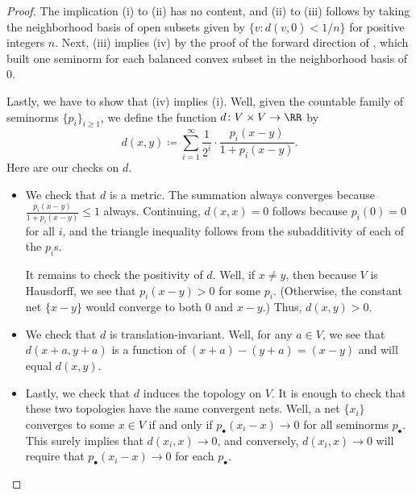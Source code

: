 \documentclass[notes.tex]{subfiles}
\begin{document}
\begin{proof}
	The implication (i) to (ii) has no content, and (ii) to (iii) follows by taking the neighborhood basis of open subsets given by $\{v:d(v,0)<1/n\}$ for positive integers $n$. Next, (iii) implies (iv) by the proof of the forward direction of , which built one seminorm for each balanced convex subset in the neighborhood basis of $0$.

	Lastly, we have to show that (iv) implies (i). Well, given the countable family of seminorms $\{p_i\}_{i\ge1}$, we define the function $d\colon V\times V\to\RR$ by
	\[d(x,y)\coloneqq\sum_{i=1}^\infty\frac1{2^i}\cdot\frac{p_i(x-y)}{1+p_i(x-y)}.\]
	Here are our checks on $d$.
	\begin{itemize}
		\item We check that $d$ is a metric. The summation always converges because $\frac{p_i(x-y)}{1+p_i(x-y)}\le1$ always. Continuing, $d(x,x)=0$ follows because $p_i(0)=0$ for all $i$, and the triangle inequality follows from the subadditivity of each of the $p_i$s.

		It remains to check the positivity of $d$. Well, if $x\ne y$, then because $V$ is Hausdorff, we see that $p_i(x-y)>0$ for some $p_i$. (Otherwise, the constant net $\{x-y\}$ would converge to both $0$ and $x-y$.) Thus, $d(x,y)>0$.

		\item We check that $d$ is translation-invariant. Well, for any $a\in V$, we see that $d(x+a,y+a)$ is a function of $(x+a)-(y+a)=(x-y)$ and will equal $d(x,y)$.

		\item Lastly, we check that $d$ induces the topology on $V$. It is enough to check that these two topologies have the same convergent nets. Well, a net $\{x_i\}$ converges to some $x\in V$ if and only if $p_\bullet(x_i-x)\to0$ for all seminorms $p_\bullet$. This surely implies that $d(x_i,x)\to0$, and conversely, $d(x_i,x)\to0$ will require that $p_\bullet(x_i-x)\to0$ for each $p_\bullet$.
		\qedhere
	\end{itemize}
\end{proof}
\end{document}

